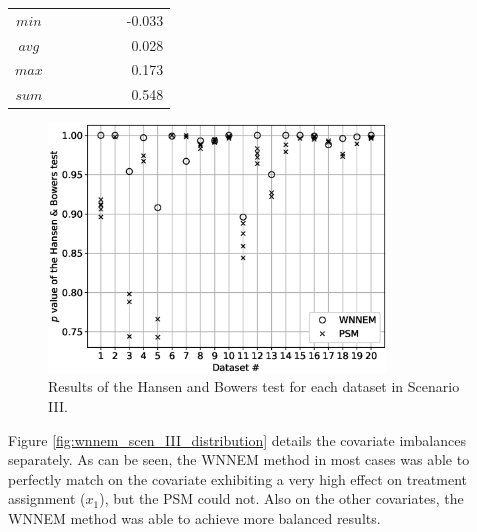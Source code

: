 \begin{table}[h]
\begin{tabular}{ccccccr}
				\midrule
				$min$   &         &           &           &           &       & -0.033     \\
				$avg$   &         &           &           &           &       & 0.028      \\
				$max$   &         &           &           &           &       & 0.173      \\
				$sum$   &         &           &           &           &       & 0.548      \\
				\bottomrule
			\end{tabular}
		\end{table}
										
										
		\begin{figure}[h]
			\centering
			\captionsetup{justification=centering}
			\includegraphics[width=0.8\textwidth]{assets/figures/control_group_selection/wnnem/scenIII/hbp.eps}
			\caption{Results of the Hansen and Bowers test for each dataset in Scenario III.}
			\label{fig:wnnem_scen_III_hbp}    
		\end{figure}
										
										
		Figure \ref{fig:wnnem_scen_III_distribution} details the covariate imbalances separately. As can be seen, the WNNEM method in most cases was able to perfectly match on the covariate exhibiting a very high effect on treatment assignment ($x_1$), but the PSM could not. Also on the other covariates, the WNNEM method was able to achieve more balanced results.
										
